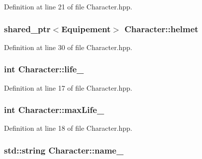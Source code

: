 Definition at line 21 of file Character.\-hpp.

\hypertarget{class_character_a0b86c1922a49c65ed6abc04f52b633fb}{
\subsubsection[{helmet}]{\setlength{\rightskip}{0pt plus 5cm}shared\-\_\-ptr$<${\bf Equipement}$>$ Character\-::helmet\hspace{0.3cm}{\ttfamily [protected]}}}\label{class_character_a0b86c1922a49c65ed6abc04f52b633fb}


Definition at line 30 of file Character.\-hpp.

\hypertarget{class_character_a7676503674823a7233994c5c6504d3b4}{
\subsubsection[{life\-\_\-}]{\setlength{\rightskip}{0pt plus 5cm}int Character\-::life\-\_\-\hspace{0.3cm}{\ttfamily [protected]}}}\label{class_character_a7676503674823a7233994c5c6504d3b4}


Definition at line 17 of file Character.\-hpp.

\hypertarget{class_character_ae9c9e6575e6bca213c523f5dbadc59d8}{
\subsubsection[{max\-Life\-\_\-}]{\setlength{\rightskip}{0pt plus 5cm}int Character\-::max\-Life\-\_\-\hspace{0.3cm}{\ttfamily [protected]}}}\label{class_character_ae9c9e6575e6bca213c523f5dbadc59d8}


Definition at line 18 of file Character.\-hpp.

\hypertarget{class_character_aca012a249f706cd301674fff9497b5de}{
\subsubsection[{name\-\_\-}]{\setlength{\rightskip}{0pt plus 5cm}std\-::string Character\-::name\-\_\-\hspace{0.3cm}{\ttfamily [protected]}}}\label{class_character_aca012a249f706cd301674fff9497b5de}


